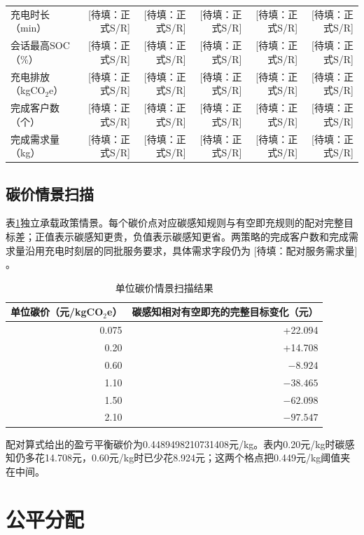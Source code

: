 \documentclass[UTF8]{setp-new}
\DeclareRobustCommand{\TBD}[1]{%
  \begingroup\setlength{\fboxsep}{1.2pt}%
  \colorbox{black!12}{\textcolor{black!65}{\textsf{\footnotesize[待填：#1]}}}%
  \endgroup}
\begin{document}
\begin{table}[htbp]
{\begin{tabular}{lrrrrr}
    充电时长（min） & \TBD{正式S/R} & \TBD{正式S/R} & \TBD{正式S/R} & \TBD{正式S/R} & \TBD{正式S/R}\\
    会话最高SOC（\%） & \TBD{正式S/R} & \TBD{正式S/R} & \TBD{正式S/R} & \TBD{正式S/R} & \TBD{正式S/R}\\
    充电排放（kgCO$_2$e） & \TBD{正式S/R} & \TBD{正式S/R} & \TBD{正式S/R} & \TBD{正式S/R} & \TBD{正式S/R}\\
    完成客户数（个） & \TBD{正式S/R} & \TBD{正式S/R} & \TBD{正式S/R} & \TBD{正式S/R} & \TBD{正式S/R}\\
    完成需求量（kg） & \TBD{正式S/R} & \TBD{正式S/R} & \TBD{正式S/R} & \TBD{正式S/R} & \TBD{正式S/R}\\
    \bottomrule
  \end{tabular}
  }
\end{table}

\subsection{碳价情景扫描}

表\ref{tab:carbon-price}独立承载政策情景。每个碳价点对应碳感知规则与有空即充规则的配对完整目标差；正值表示碳感知更贵，负值表示碳感知更省。两策略的完成客户数和完成需求量沿用充电时刻层的同批服务要求，具体需求字段仍为\TBD{配对服务需求量}。

\begin{table}[htbp]
  \centering
  \caption{单位碳价情景扫描结果}
  \label{tab:carbon-price}
  \small
  \begin{tabular}{rr}
    \toprule
    单位碳价（元/kgCO$_2$e） & 碳感知相对有空即充的完整目标变化（元）\\
    \midrule
    0.075 & +22.094\\
    0.20 & +14.708\\
    0.60 & $-8.924$\\
    1.10 & $-38.465$\\
    1.50 & $-62.098$\\
    2.10 & $-97.547$\\
    \bottomrule
  \end{tabular}
\end{table}

配对算式给出的盈亏平衡碳价为0.4489498210731408元/kg。表内0.20元/kg时碳感知仍多花14.708元，0.60元/kg时已少花8.924元；这两个格点把0.449元/kg阈值夹在中间。

\section{公平分配}
\end{document}
